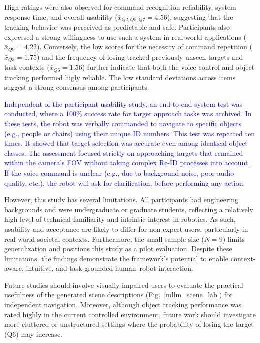 \documentclass[lettersize,journal]{IEEEtran}
\begin{document}
High ratings were also observed for command recognition reliability, system response time, and overall usability ($\bar{x}_{Q2,Q5,Q7} = 4.56$), suggesting that the tracking behavior was perceived as predictable and safe. Participants also expressed a strong willingness to use such a system in real-world applications ($\bar{x}_{Q9} = 4.22$). Conversely, the low scores for the necessity of command repetition ($\bar{x}_{Q3} = 1.75$) and the frequency of losing  tracked   previously unseen targets and task contexts ($\bar{x}_{Q6} = 1.56$) further indicate that both the voice control and object tracking performed higly reliable. The low standard deviations across items suggest a strong consensus among participants.

\textcolor{blue}{Independent of the participant usability study, an end-to-end system test was conducted, where a $100\%$ success rate for target approach tasks was archived. In these tests, the robot was verbally commanded to navigate to specific objects (e.g., people or chairs) using their unique ID numbers. This test was repeated ten times. It showed that target selection was accurate even among identical object classes. The assessment focused strictly on approaching targets that remained within the camera's FOV without taking complex Re-ID processes into account. If the voice command is unclear (e.g., due to background noise, poor audio quality, etc.), the robot will ask for clarification, before performing any action.}

However, this study has several limitations. All participants had engineering backgrounds and were undergraduate or graduate students, reflecting a relatively high level of technical familiarity and intrinsic interest in robotics. As such, usability and acceptance are likely to differ for non-expert users, particularly in real-world societal contexts. Furthermore, the small sample size ($N=9$) limits generalization and positions this study as a pilot evaluation. Despite these limitations, the findings demonstrate the framework’s potential to enable context-aware, intuitive, and task-grounded human–robot interaction.

Future studies should involve visually impaired users to evaluate the practical usefulness of the generated scene descriptions (Fig.~\ref{mllm_scene_lab}) for independent navigation. Moreover, although object tracking performance was rated highly in the current controlled environment, future work should investigate more cluttered or unstructured settings where the probability of losing the target (Q6) may increase.
\end{document}
